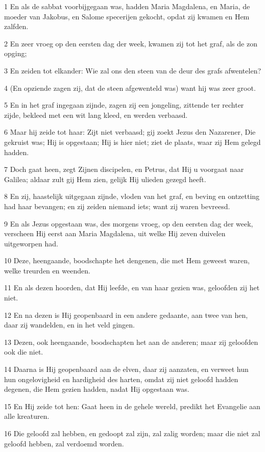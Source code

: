\par 1 En als de sabbat voorbijgegaan was, hadden Maria Magdalena, en Maria, de moeder van Jakobus, en Salome specerijen gekocht, opdat zij kwamen en Hem zalfden.
\par 2 En zeer vroeg op den eersten dag der week, kwamen zij tot het graf, als de zon opging;
\par 3 En zeiden tot elkander: Wie zal ons den steen van de deur des grafs afwentelen?
\par 4 (En opziende zagen zij, dat de steen afgewenteld was) want hij was zeer groot.
\par 5 En in het graf ingegaan zijnde, zagen zij een jongeling, zittende ter rechter zijde, bekleed met een wit lang kleed, en werden verbaasd.
\par 6 Maar hij zeide tot haar: Zijt niet verbaasd; gij zoekt Jezus den Nazarener, Die gekruist was; Hij is opgestaan; Hij is hier niet; ziet de plaats, waar zij Hem gelegd hadden.
\par 7 Doch gaat heen, zegt Zijnen discipelen, en Petrus, dat Hij u voorgaat naar Galilea; aldaar zult gij Hem zien, gelijk Hij ulieden gezegd heeft.
\par 8 En zij, haastelijk uitgegaan zijnde, vloden van het graf, en beving en ontzetting had haar bevangen; en zij zeiden niemand iets; want zij waren bevreesd.
\par 9 En als Jezus opgestaan was, des morgens vroeg, op den eersten dag der week, verscheen Hij eerst aan Maria Magdalena, uit welke Hij zeven duivelen uitgeworpen had.
\par 10 Deze, heengaande, boodschapte het dengenen, die met Hem geweest waren, welke treurden en weenden.
\par 11 En als dezen hoorden, dat Hij leefde, en van haar gezien was, geloofden zij het niet.
\par 12 En na dezen is Hij geopenbaard in een andere gedaante, aan twee van hen, daar zij wandelden, en in het veld gingen.
\par 13 Dezen, ook heengaande, boodschapten het aan de anderen; maar zij geloofden ook die niet.
\par 14 Daarna is Hij geopenbaard aan de elven, daar zij aanzaten, en verweet hun hun ongelovigheid en hardigheid des harten, omdat zij niet geloofd hadden degenen, die Hem gezien hadden, nadat Hij opgestaan was.
\par 15 En Hij zeide tot hen: Gaat heen in de gehele wereld, predikt het Evangelie aan alle kreaturen.
\par 16 Die geloofd zal hebben, en gedoopt zal zijn, zal zalig worden; maar die niet zal geloofd hebben, zal verdoemd worden.
